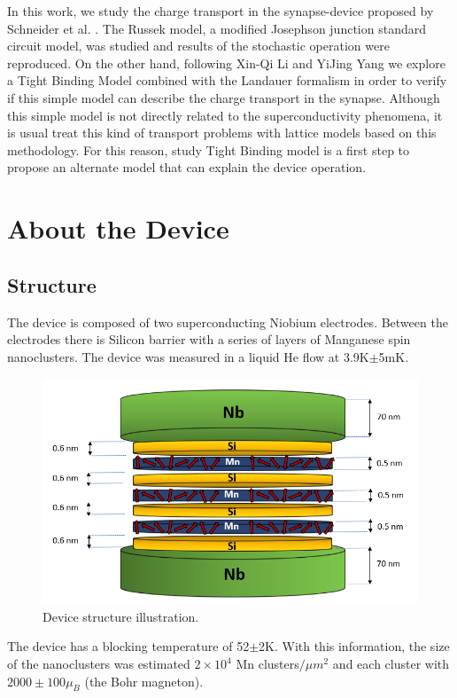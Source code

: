 \documentclass[12pt]{article}
\begin{document}
In this work, we study the charge transport in the synapse-device proposed by Schneider et al. \cite{MAINREF}. The Russek model, a modified Josephson junction standard circuit model, was studied and results of the stochastic operation were reproduced. On the other hand, following Xin-Qi Li and YiJing Yang \cite{CORRIENTES} we explore a Tight Binding Model combined with the Landauer formalism in order to verify if this simple model can describe the charge transport in the synapse. Although this simple model is not directly related to the superconductivity phenomena, it is usual treat this kind of transport problems with lattice models based on this methodology. For this reason, study Tight Binding model is a first step to propose an alternate model that can explain the device operation.
 
 
\section{About the Device}

\subsection{Structure}
The device is composed of two superconducting Niobium electrodes. Between the electrodes there is Silicon barrier with a series of layers of Manganese spin nanoclusters. The device was measured in a liquid He flow at 3.9K$\pm$5mK.  

\begin{figure}[ht]
    \centering
     \includegraphics[scale=0.5]{Device.png}
    \caption{Device structure illustration.}
    \label{Device}
\end{figure}

The device has a blocking temperature of 52$\pm$2K. With this information, the size of the nanoclusters was estimated $2\times 10^{4}$ Mn clusters$/\mu m^{2}$ and each cluster with $2000\pm 100 \mu_{B}$ (the Bohr magneton).
\end{document}
